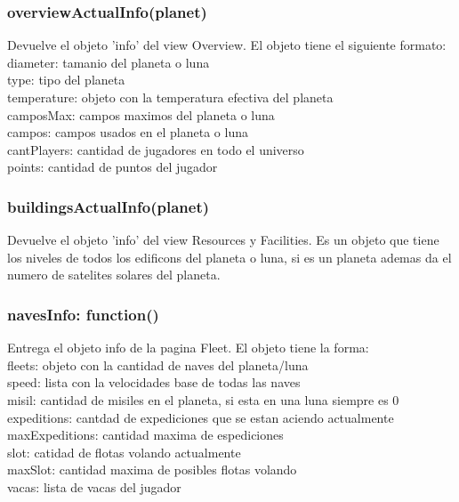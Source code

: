 \documentclass{article}
\newcommand\tab[1][1cm]{\hspace*{#1}}
\begin{document}
        \subsubsection{overviewActualInfo(planet)}
          Devuelve el objeto 'info' del view Overview. El objeto tiene el siguiente formato:\\
          \tab diameter: tamanio del planeta o luna\\
          \tab type: tipo del planeta\\
          \tab temperature: objeto con la temperatura efectiva del planeta\\
          \tab camposMax: campos maximos del planeta o luna\\
          \tab campos: campos usados en el planeta o luna\\
          \tab cantPlayers: cantidad de jugadores en todo el universo\\
          \tab points: cantidad de puntos del jugador\\
        \subsubsection{buildingsActualInfo(planet)}
          Devuelve el objeto 'info' del view Resources y Facilities. Es un objeto que tiene los niveles de todos los edificons del planeta o luna, si es un planeta ademas da el numero de satelites solares del planeta.
        \subsubsection{navesInfo: function()}
            Entrega el objeto info de la pagina Fleet. El objeto tiene la forma:\\
            \tab fleets: objeto con la cantidad de naves del planeta/luna\\
            \tab speed: lista con la velocidades base de todas las naves\\
            \tab misil: cantidad de misiles en el planeta, si esta en una luna siempre es 0\\
            \tab expeditions: cantdad de expediciones que se estan aciendo actualmente\\
            \tab maxExpeditions: cantidad maxima de espediciones\\
            \tab slot: catidad de flotas volando actualmente\\
            \tab maxSlot: cantidad maxima de posibles flotas volando\\
            \tab vacas: lista de vacas del jugador\\
\end{document}
